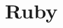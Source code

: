 \documentclass[../Languages.tex]{subfiles}
\begin{document}
\section{Ruby}\label{sec:ruby}

\newpage
\end{document}
